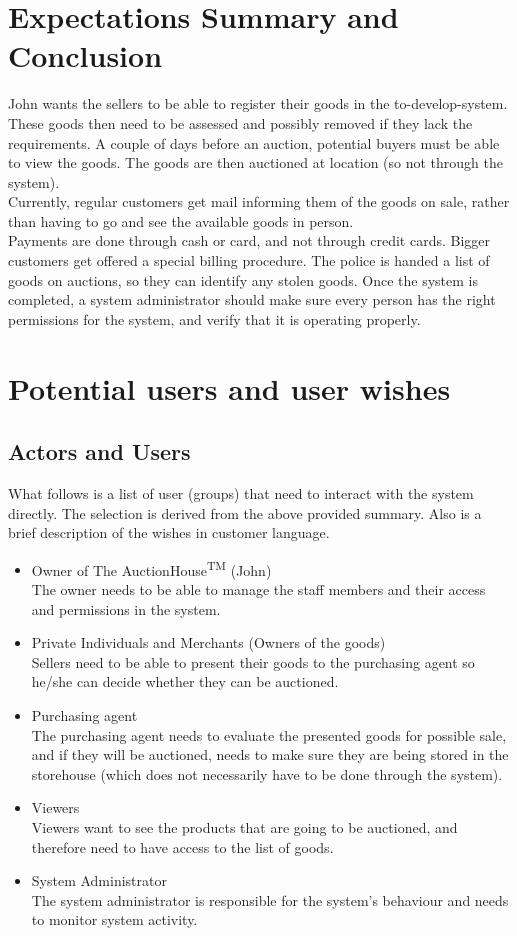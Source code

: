 \documentclass{article}
\begin{document}
\section*{Expectations Summary and Conclusion}
John wants the sellers to be able to register their goods in the to-develop-system. These goods then need to be assessed and possibly removed if they lack the requirements. A couple of days before an auction, potential buyers must be able to view the goods. The goods are then auctioned at location (so not through the system).\\
Currently, regular customers get mail informing them of the goods on sale, rather than having to go and see the available goods in person.\\
Payments are done through cash or card, and not through credit cards. Bigger customers get offered a special billing procedure.
The police is handed a list of goods on auctions, so they can identify any stolen goods.
Once the system is completed, a system administrator should make sure every person has the right permissions for the system, and verify that it is operating properly.

\section*{Potential users and user wishes}
\subsection*{Actors and Users}
What follows is a list of user (groups) that need to interact with the system directly. The selection is derived from the above provided summary. Also is a brief description of the wishes in customer language.
\begin{itemize}[noitemsep]
	\item Owner of The AuctionHouse\textsuperscript{TM} (John)\\
		The owner needs to be able to manage the staff members and their access and permissions in the system.
	\item Private Individuals and Merchants (Owners of the goods)\\
		Sellers need to be able to present their goods to the purchasing agent so he/she can decide whether they can be auctioned.
	\item Purchasing agent\\
		The purchasing agent needs to evaluate the presented goods for possible sale, and if they will be auctioned, needs to make sure they are being stored in the storehouse (which does not necessarily have to be done through the system).
	\item Viewers\\
		Viewers want to see the products that are going to be auctioned, and therefore need to have access to the list of goods.
	\item System Administrator\\
		The system administrator is responsible for the system's behaviour and needs to monitor system activity.
\end{itemize}
\end{document}

